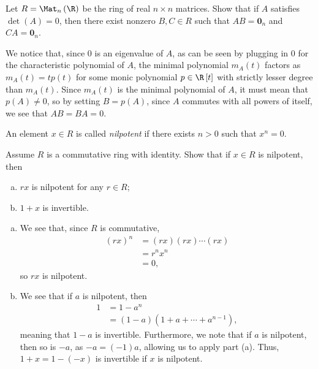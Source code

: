 \documentclass[10pt]{mypackage}
\begin{document}
\begin{problem}[Problem 5]
  Let $ R = \Mat_{n}\left( \R \right) $ be the ring of real $n\times n$ matrices. Show that if $A$ satisfies $\det\left( A \right) = 0$, then there exist nonzero $B,C\in R$ such that $AB = \mathbf{0}_{n}$ and $CA = \mathbf{0}_{n}$.
\end{problem}
\begin{solution}
  We notice that, since $0$ is an eigenvalue of $A$, as can be seen by plugging in $0$ for the characteristic polynomial of $A$, the minimal polynomial $m_A(t)$ factors as $m_A(t) =t p(t)$ for some monic polynomial $p\in \R\left[ t \right]$ with strictly lesser degree than $m_A(t)$. Since $m_A(t)$ is the minimal polynomial of $A$, it must mean that $p(A) \neq 0$, so by setting $B = p(A)$, since $A$ commutes with all powers of itself, we see that $AB = BA = 0$.
\end{solution}
\begin{problem}[Problem 6]
  An element $x\in R$ is called \textit{nilpotent} if there exists $n > 0$ such that $x^{n} = 0$.\newline

  Assume $R$ is a commutative ring with identity. Show that if $x\in R$ is nilpotent, then
  \begin{enumerate}[(a)]
    \item $rx$ is nilpotent for any $r\in R$;
    \item $1+x$ is invertible.
  \end{enumerate}
\end{problem}
\begin{solution}\hfill
  \begin{enumerate}[(a)]
    \item We see that, since $R$ is commutative,
      \begin{align*}
        \left( rx \right)^{n} &= \left( rx \right)\left( rx \right)\cdots \left( rx \right)\\
                              &= r^{n}x^{n}\\
                              &= 0,
      \end{align*}
      so $rx$ is nilpotent.
    \item We see that if $a$ is nilpotent, then
      \begin{align*}
        1 &= 1-a^{n}\\
          &= \left( 1-a \right)\left( 1 + a + \cdots + a^{n-1} \right),
      \end{align*}
      meaning that $1-a$ is invertible. Furthermore, we note that if $a$ is nilpotent, then so is $-a$, as $-a = \left( -1 \right)a$, allowing us to apply part (a). Thus, $1+x = 1-\left( -x \right)$ is invertible if $x$ is nilpotent.
  \end{enumerate}
\end{solution}
\end{document}
